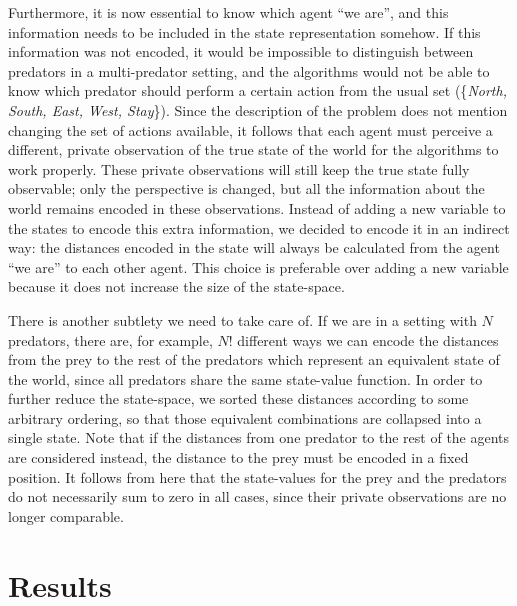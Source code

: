 \documentclass[a4paper,12pt]{article}
\begin{document}
Furthermore, it is now essential to know which agent ``we are'', and this information needs to be included in the state representation somehow. If this information was not encoded, it would be impossible to distinguish between predators in a multi-predator setting, and the algorithms would not be able to know which predator should perform a certain action from the usual set (\{\textit{North, South, East, West, Stay}\}). Since the description of the problem does not mention changing the set of actions available, it follows that each agent must perceive a different, private observation of the true state of the world for the algorithms to work properly. These private observations will still keep the true state fully observable; only the perspective is changed, but all the information about the world remains encoded in these observations. Instead of adding a new variable to the states to encode this extra information, we decided to encode it in an indirect way: the distances encoded in the state will always be calculated from the agent ``we are'' to each other agent. This choice is preferable over adding a new variable because it does not increase the size of the state-space.

There is another subtlety we need to take care of. If we are in a setting with $N$ predators, there are, for example, $N!$ different ways we can encode the distances from the prey to the rest of the predators which represent an equivalent state of the world, since all predators share the same state-value function. In order to further reduce the state-space, we sorted these distances according to some arbitrary ordering, so that those equivalent combinations are collapsed into a single state. Note that if the distances from one predator to the rest of the agents are considered instead, the distance to the prey must be encoded in a fixed position. It follows from here that the state-values for the prey and the predators do not necessarily sum to zero in all cases, since their private observations are no longer comparable.

\section{Results}
\end{document}
